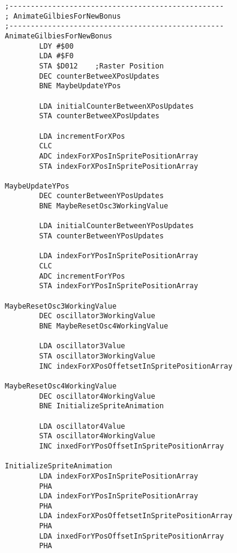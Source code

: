 \begin{minipage}[b]{0.45\linewidth}
\centering
{}%

\end{minipage}
\hspace{0.5cm}
\begin{minipage}[b]{0.45\linewidth}
\centering
\begin{lstlisting}[basicstyle=\tiny,caption=... and Iridis Alpha.]
;--------------------------------------------------
; AnimateGilbiesForNewBonus
;--------------------------------------------------
AnimateGilbiesForNewBonus
        LDY #$00
        LDA #$F0
        STA $D012    ;Raster Position
        DEC counterBetweeXPosUpdates
        BNE MaybeUpdateYPos

        LDA initialCounterBetweenXPosUpdates
        STA counterBetweeXPosUpdates

        LDA incrementForXPos
        CLC
        ADC indexForXPosInSpritePositionArray
        STA indexForXPosInSpritePositionArray

MaybeUpdateYPos   
        DEC counterBetweenYPosUpdates
        BNE MaybeResetOsc3WorkingValue

        LDA initialCounterBetweenYPosUpdates
        STA counterBetweenYPosUpdates

        LDA indexForYPosInSpritePositionArray
        CLC
        ADC incrementForYPos
        STA indexForYPosInSpritePositionArray

MaybeResetOsc3WorkingValue   
        DEC oscillator3WorkingValue
        BNE MaybeResetOsc4WorkingValue

        LDA oscillator3Value
        STA oscillator3WorkingValue
        INC indexForXPosOffetsetInSpritePositionArray

MaybeResetOsc4WorkingValue   
        DEC oscillator4WorkingValue
        BNE InitializeSpriteAnimation

        LDA oscillator4Value
        STA oscillator4WorkingValue
        INC inxedForYPosOffsetInSpritePositionArray

InitializeSpriteAnimation   
        LDA indexForXPosInSpritePositionArray
        PHA
        LDA indexForYPosInSpritePositionArray
        PHA
        LDA indexForXPosOffetsetInSpritePositionArray
        PHA
        LDA inxedForYPosOffsetInSpritePositionArray
        PHA
\end{lstlisting}
\end{minipage}
